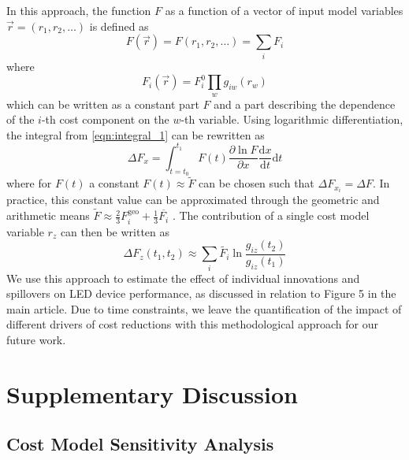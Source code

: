 \documentclass[parskip=full]{article}
\begin{document}
In this approach, the function $F$ as a function of a vector of input model variables $\vec{r}=(r_1,r_2,\dots)$ is defined as
%
\begin{equation}
    F(\vec{r}) = F(r_1,r_2, \dots) = \sum_i F_i
\end{equation}
where
\begin{equation}
    F_i(\vec{r}) = F_i^0 \prod_w g_{iw}(r_w)
\end{equation}
%
which can be written as a constant part $F$ and a part describing the dependence of the $i$-th cost component on the $w$-th variable.
%
Using logarithmic differentiation, the integral from  \cref{eqn:integral_1} can be rewritten as
\begin{equation}
    \Delta F_x = \int_{t=t_0}^{t_1} F(t) \frac{ \partial \ln F }{ \partial x } \frac{ \text{d} x }{ \text{d} t} \text{d} t
\end{equation}
%
where for $F(t)$ a constant $F(t) \approx \tilde{F} $ can be chosen such that $\Delta F_{x_i} = \Delta F$. In practice, this constant value can be approximated through the geometric and arithmetic means $\tilde{F} \approx \frac{2}{3} F_i^\text{geo} + \frac{1}{3} \overline{F_i}$ \cite{kavlak2018evaluating}. The contribution of a single cost model variable $r_z$ can then be written as
%
\begin{equation}
    \Delta F_z (t_1,t_2) \approx \sum_i \tilde{F_i} \ln \frac{g_{iz}(t_2)}{g_{iz}(t_1)}
\end{equation}
%
We use this approach to estimate the effect of individual innovations and spillovers on LED device performance, as discussed in relation to Figure 5 in the main article. Due to time constraints, we leave the quantification of the impact of different drivers of cost reductions with this methodological approach for our future work.

\clearpage

\section{Supplementary Discussion}

\subsection{Cost Model Sensitivity Analysis}
\end{document}
